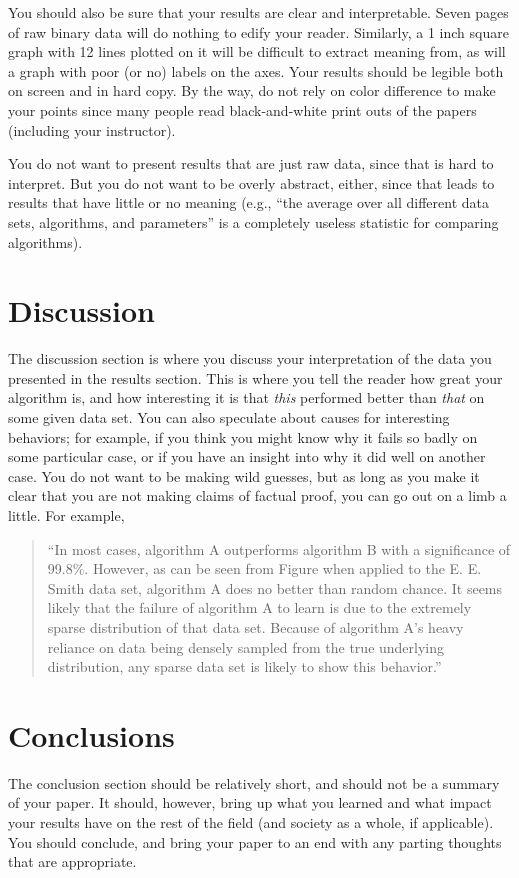 \documentclass[12pt,letterpaper]{article}
\begin{document}
You should also be sure that your results are clear and interpretable.  Seven
pages of raw binary data will do nothing to edify your reader.  Similarly, a
1 inch square graph with 12 lines plotted on it will be difficult to extract
meaning from, as will a graph with poor (or no) labels on the axes.  Your
results should be legible both on screen and in hard copy. By the way, do
not rely on color difference to make your points since many people read
black-and-white print outs of the papers (including your instructor).

You do not want to present results that are just raw data, since that is hard to
interpret.  But you do not want to be overly abstract, either, since that leads to
results that have little or no meaning (e.g., ``the average over all different
data sets, algorithms, and parameters'' is a completely useless statistic for
comparing algorithms).

\section{Discussion}
The discussion section is where you discuss your interpretation of the data you
presented in the results section.  This is where you tell the reader how great
your algorithm is, and how interesting it is that \emph{this} performed better
than \emph{that} on some given data set.  You can also speculate about causes
for interesting behaviors; for example, if you think you might know why it fails
so badly on some particular case, or if you have an insight into why it did well
on another case.  You do not want to be making wild guesses, but as long as you
make it clear that you are not making claims of factual proof, you can go out on
a limb a little.  For example,

\begin{quote}
``In most cases, algorithm A outperforms algorithm B with a significance of
99.8\%.  However, as can be seen from Figure when applied to
the E. E. Smith data set, algorithm A does no better than random chance.  It
seems likely that the failure of algorithm A to learn is due to the extremely
sparse distribution of that data set.  Because of algorithm A's heavy reliance
on data being densely sampled from the true underlying distribution, any sparse
data set is likely to show this behavior.''
\end{quote}

\section{Conclusions}
The conclusion section should be relatively short, and should not be a summary
of your paper.  It should, however, bring up what you learned and what impact
your results have on the rest of the field (and society as a
whole, if applicable).  You should conclude, and bring your paper to an  end
with any parting thoughts that are appropriate.
\end{document}
